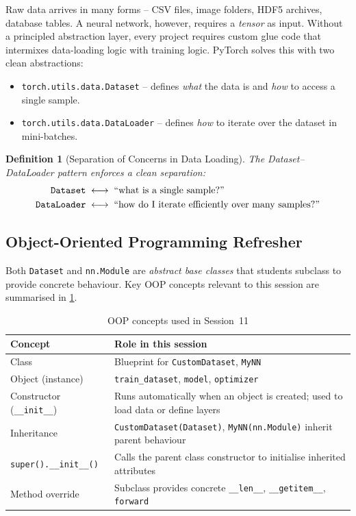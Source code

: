 \documentclass[12pt,a4paper]{article}
\newtheorem{definition}{Definition}[section]
\begin{document}
Raw data arrives in many forms -- CSV files, image folders, HDF5 archives,
database tables.  A neural network, however, requires a \emph{tensor} as
input.  Without a principled abstraction layer, every project requires custom
glue code that intermixes data-loading logic with training logic.  PyTorch
solves this with two clean abstractions:

\begin{itemize}
  \item \texttt{torch.utils.data.Dataset} -- defines \emph{what} the data is
        and \emph{how} to access a single sample.
  \item \texttt{torch.utils.data.DataLoader} -- defines \emph{how} to iterate
        over the dataset in mini-batches.
\end{itemize}

\begin{definition}[Separation of Concerns in Data Loading]
\label{def:separation}
The \emph{Dataset--DataLoader} pattern enforces a clean separation:
\begin{align}
  \texttt{Dataset} &\;\longleftrightarrow\; \text{``what is a single sample?''} \notag \\
  \texttt{DataLoader} &\;\longleftrightarrow\; \text{``how do I iterate efficiently over many samples?''} \notag
\end{align}
\end{definition}

\subsection{Object-Oriented Programming Refresher}

Both \texttt{Dataset} and \texttt{nn.Module} are \emph{abstract base classes}
that students subclass to provide concrete behaviour.  Key OOP concepts
relevant to this session are summarised in \cref{tab:oop}.

\begin{table}[htbp]
  \centering
  \caption{OOP concepts used in Session~11}
  \label{tab:oop}
  \begin{tabularx}{\linewidth}{lX}
    \toprule
    \textbf{Concept} & \textbf{Role in this session} \\
    \midrule
    Class & Blueprint for \texttt{CustomDataset}, \texttt{MyNN} \\
    Object (instance) & \texttt{train\_dataset}, \texttt{model}, \texttt{optimizer} \\
    Constructor (\texttt{\_\_init\_\_}) & Runs automatically when an object is created; used to load data or define layers \\
    Inheritance & \texttt{CustomDataset(Dataset)}, \texttt{MyNN(nn.Module)} inherit parent behaviour \\
    \texttt{super().\_\_init\_\_()} & Calls the parent class constructor to initialise inherited attributes \\
    Method override & Subclass provides concrete \texttt{\_\_len\_\_}, \texttt{\_\_getitem\_\_}, \texttt{forward} \\
    \bottomrule
  \end{tabularx}
\end{table}
\end{document}
